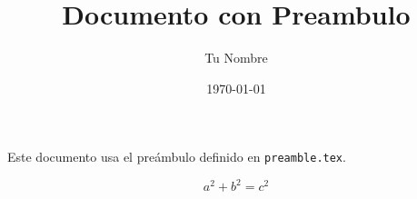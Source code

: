


\title{Documento con Preambulo}
\author{Tu Nombre}
\date{\today}



\maketitle

Este documento usa el preámbulo definido en \texttt{preamble.tex}.

\[
a^2 + b^2 = c^2
\]


